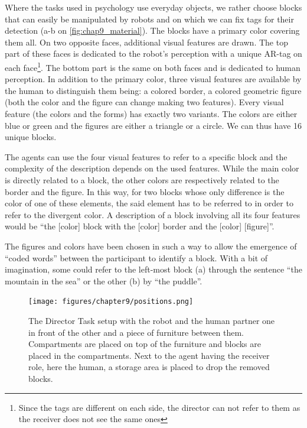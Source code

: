 Where the tasks used in psychology use everyday objects, we rather choose blocks that can easily be manipulated by robots and on which we can fix tags for their detection (a-b on \ref{fig:chap9_material}). The blocks have a primary color covering them all. On two opposite faces, additional visual features are drawn. The top part of these faces is dedicated to the robot's perception with a unique AR-tag on each face\footnote{Since the tags are different on each side, the director can not refer to them as the receiver does not see the same ones}. The bottom part is the same on both faces and is dedicated to human perception. In addition to the primary color, three visual features are available by the human to distinguish them being: a colored border, a colored geometric figure (both the color and the figure can change making two features). Every visual feature (the colors and the forms) has exactly two variants. The colors are either blue or green and the figures are either a triangle or a circle. We can thus have 16 unique blocks.

The agents can use the four visual features to refer to a specific block and the complexity of the description depends on the used features. While the main color is directly related to a block, the other colors are respectively related to the border and the figure. In this way, for two blocks whose only difference is the color of one of these elements, the said element has to be referred to in order to refer to the divergent color. A description of a block involving all its four features would be ``the [color] block with the [color] border and the [color] [figure]''.

The figures and colors have been chosen in such a way to allow the emergence of ``coded words'' between the participant to identify a block. With a bit of imagination, some could refer to the left-most block (a) through the sentence ``the mountain in the sea'' or the other (b) by ``the puddle''.

\begin{figure}[ht!]
\centering
\texttt{[image: figures/chapter9/positions.png]}
\caption{\label{fig:chap9_positions} The Director Task setup with the robot and the human partner one in front of the other and a piece of furniture between them. Compartments are placed on top of the furniture and blocks are placed in the compartments. Next to the agent having the receiver role, here the human, a storage area is placed to drop the removed blocks. }
\end{figure}

